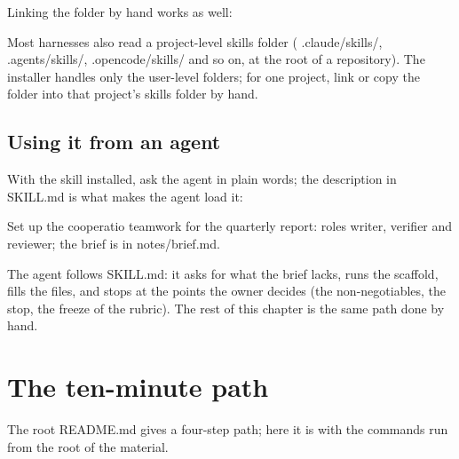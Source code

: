 \documentclass[
  american,
  10pt,
]{report}
\newenvironment{Shaded}{\begin{snugshade}}{\end{snugshade}}
\newcommand{\AttributeTok}[1]{\textcolor[rgb]{0.13,0.29,0.53}{#1}}
\newcommand{\FunctionTok}[1]{\textcolor[rgb]{0.13,0.29,0.53}{\textbf{#1}}}
\newcommand{\NormalTok}[1]{#1}
\newcommand{\StringTok}[1]{\textcolor[rgb]{0.31,0.60,0.02}{#1}}
\newcommand{\VariableTok}[1]{\textcolor[rgb]{0.00,0.00,0.00}{#1}}
\renewenvironment{Shaded}{%
  \def\FrameCommand{{\color{rulecolor}\vrule width 2pt}\hspace{6pt}\colorbox{shadecolor}}%
  \MakeFramed{\advance\hsize-\width\FrameRestore}\small}%
  {\endMakeFramed}
\renewcommand{\texttt}[1]{{\ttfamily\hyphenchar\font=-1 #1}}
\begin{document}
Linking the folder by hand works as well:

\begin{Shaded}
\end{Shaded}

Most harnesses also read a project-level skills folder
(\texttt{.\allowbreak{}claude/\allowbreak{}skills/\allowbreak{}},
\texttt{.\allowbreak{}agents/\allowbreak{}skills/\allowbreak{}},
\texttt{.\allowbreak{}opencode/\allowbreak{}skills/\allowbreak{}} and so
on, at the root of a repository). The installer handles only the
user-level folders; for one project, link or copy the folder into that
project's skills folder by hand.

\subsection{Using it from an agent}\label{using-it-from-an-agent}

With the skill installed, ask the agent in plain words; the description
in \texttt{SKILL.\allowbreak{}md} is what makes the agent load it:

\begin{Shaded}
\begin{Highlighting}[]
\NormalTok{Set up the cooperatio teamwork for the quarterly report: roles writer,}
\NormalTok{verifier and reviewer; the brief is in notes/brief.md.}
\end{Highlighting}
\end{Shaded}

The agent follows \texttt{SKILL.\allowbreak{}md}: it asks for what the
brief lacks, runs the scaffold, fills the files, and stops at the points
the owner decides (the non-negotiables, the stop, the freeze of the
rubric). The rest of this chapter is the same path done by hand.

\section{The ten-minute path}\label{the-ten-minute-path}

The root \texttt{README.\allowbreak{}md} gives a four-step path; here it
is with the commands run from the root of the material.
\end{document}
